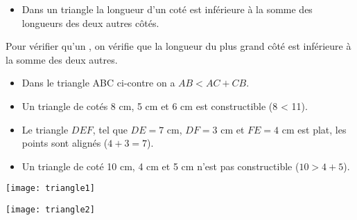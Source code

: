\begin{myprop}
	\begin{itemize}
		\item Dans un triangle la longueur d'un coté est inférieure à la somme des longueurs des deux autres côtés.
		
	\end{itemize}
	
\end{myprop}

\begin{mymeth}
	Pour vérifier qu'un , on vérifie que la longueur du plus grand côté  est inférieure à la somme des deux autres.
\end{mymeth}

\begin{myexs}
	\begin{multicols}{2}
		\begin{itemize}
			\item Dans le triangle ABC ci-contre on a $AB < AC + CB.$
			\item Un triangle de cotés 8 cm, 5 cm et 6 cm est constructible (8 < 11).
			
			\item Le triangle $DEF$, tel que $DE = 7$ cm, $DF = 3$ cm et $FE = 4$ cm est plat, les points sont alignés ($4 + 3 = 7$).
			
			\item Un triangle de coté 10 cm, 4 cm et 5 cm n'est pas constructible ($10 > 4 + 5$).
		\end{itemize}
		
		
		\begin{center}
			\texttt{[image: triangle1]}
		
		\texttt{[image: triangle2]}
		\end{center}
	\end{multicols}
\end{myexs}

